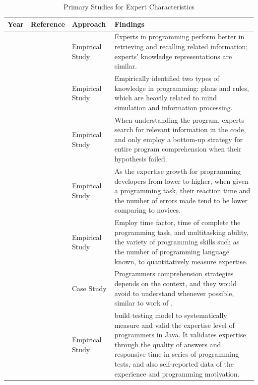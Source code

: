\begin{table}[htbp]
\centering
\small
\settowidth{}
\begin{tabulary}{\textwidth}{LLLL}
\hline
\textbf{Year}           & \textbf{Reference}          & \textbf{Approach}           & \textbf{Findings} \\ \hline
\citeyear{MCKEITHEN1981307} & \citeauthor{MCKEITHEN1981307}\cite{MCKEITHEN1981307} & Empirical Study & Experts in programming perform better in retrieving and recalling related information; experts' knowledge representations are similar.\\ \hline

\citeyear{soloway1984empirical} & \citeauthor{soloway1984empirical}\cite{soloway1984empirical} & Empirical Study & Empirically identified two types of knowledge in programming: plans and rules, which are heavily related to mind simulation and information processing. \\ \hline

\citeyear{koenemann1991expert} & \citeauthor{koenemann1991expert}\cite{koenemann1991expert} & Empirical Study & When understanding the program, experts search for relevant information in the code, and only employ a bottom-up strategy for entire program comprehension when their hypothesis failed.\\ \hline

\citeyear{davies1994knowledge} &\citeauthor{davies1994knowledge}\cite{davies1994knowledge} & Empirical Study & As the expertise growth for programming developers from lower to higher, when given a programming task, their reaction time and the number of errors made tend to be lower comparing to novices.\\ \hline

\citeyear{stanislaw1994note} &\citeauthor{stanislaw1994note}\cite{stanislaw1994note} & Empirical Study & Employ time factor, time of complete the programming task, and multitasking ability, the variety of programming skills such as the number of programming language known, to quantitatively measure expertise.\\\hline

\citeyear{maalej2014comprehension} & \citeauthor{maalej2014comprehension}\cite{maalej2014comprehension} & Case Study & Programmers comprehension strategies depends on the context, and they would avoid to understand whenever possible, similar to work of \citeauthor{koenemann1991expert}.\\\hline

\citeyear{bergersen2014construction} &\citeauthor{bergersen2014construction}\cite{bergersen2014construction} & Empirical Study & \citeauthor{bergersen2014construction} build testing model to systematically measure and valid the expertise level of programmers in Java. It validates expertise through the quality of answers and responsive time in series of programming tests, and also self-reported data of the experience and programming motivation.\\ \hline

\end{tabulary}
\caption{Primary Studies for Expert Characteristics}
\label{tab:expertCharacteristics}
\end{table}

